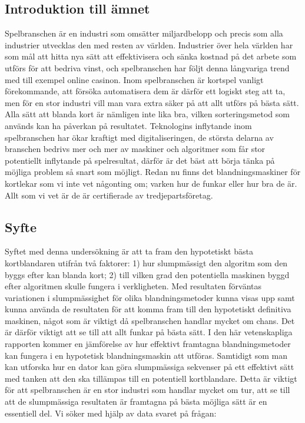 \documentclass[swedish,a4paper]{article}
\begin{document}
\subsection{Introduktion till ämnet}
Spelbranschen är en industri som omsätter miljardbelopp och precis som alla
industrier utvecklas den med resten av världen. Industrier över hela världen har
som mål att hitta nya sätt att effektivisera och sänka kostnad på det arbete som
utförs för att bedriva vinst, och spelbranschen har följt denna långvariga trend
med till exempel online casinon. Inom spelbranschen är kortspel vanligt
förekommande, att försöka automatisera dem är därför ett logiskt steg att ta, men för
en stor industri vill man vara extra säker på att allt utförs på bästa sätt.
Alla sätt att blanda kort är nämligen inte lika bra, vilken sorteringsmetod som
används kan ha påverkan på resultatet. Teknologins inflytande inom spelbranschen har
ökar kraftigt med digitaliseringen, de största delarna av branschen bedrivs mer och mer av maskiner
och algoritmer som får stor potentiellt inflytande på spelresultat, därför är
det bäst att börja tänka på möjliga problem så snart som möjligt. Redan nu finns
det blandningsmaskiner för kortlekar som vi inte vet någonting om; varken hur de
funkar eller hur bra de är. Allt som vi vet är de är certifierade av
tredjepartsföretag.

\subsection{Syfte}
\label{sec:purpose}
Syftet med denna undersökning är att ta fram den hypotetiskt bästa kortblandaren
utifrån två faktorer: 1) hur slumpmässigt den algoritm som den byggs efter kan
blanda kort; 2) till vilken grad den potentiella maskinen byggd efter algoritmen
skulle fungera i verkligheten. Med resultaten förväntas variationen i
slumpmässighet för olika blandningsmetoder kunna visas upp samt kunna använda de
resultaten för att komma fram till den hypotetiskt definitiva maskinen, något
som är viktigt då spelbranschen handlar mycket om chans. Det är därför viktigt
att se till att allt funkar på bästa sätt. I den här vetenskapliga rapporten
kommer en jämförelse av hur effektivt framtagna blandningsmetoder kan fungera i
en hypotetisk blandningsmaskin att utföras. Samtidigt som man kan utforska hur
en dator kan göra slumpmässiga sekvenser på ett effektivt sätt med tanken att
den ska tillämpas till en potentiell kortblandare. Detta är viktigt för att
spelbranschen är en stor industri som handlar mycket om tur, att se till att de
slumpmässiga resultaten är framtagna på bästa möjliga sätt är en essentiell del.
Vi söker med hjälp av data svaret på frågan:
\end{document}
